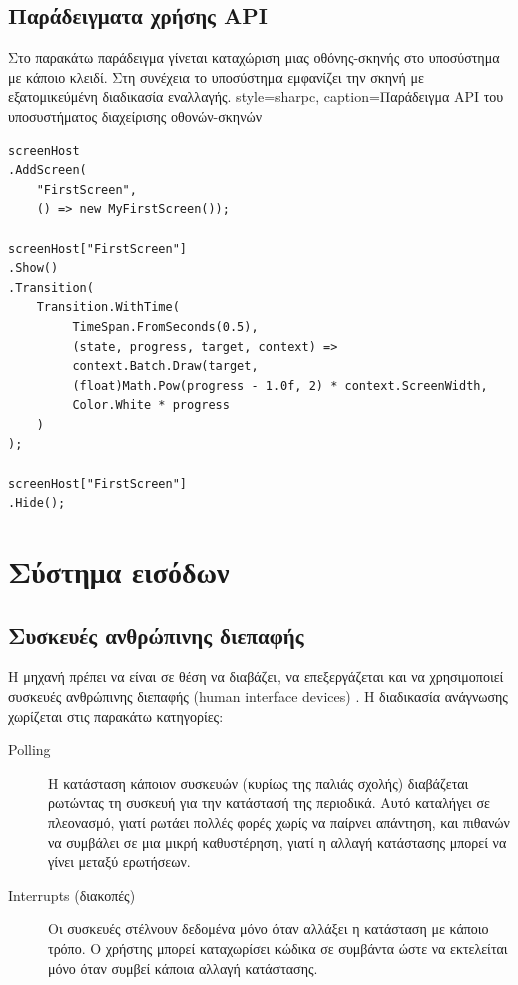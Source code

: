 	\subsection{Παράδειγματα χρήσης API}

Στο παρακάτω παράδειγμα γίνεται καταχώριση μιας οθόνης-σκηνής στο υποσύστημα με κάποιο κλειδί. Στη συνέχεια το υποσύστημα εμφανίζει την σκηνή με εξατομικεύμένη διαδικασία εναλλαγής.
	\lstset
	{
		style=sharpc, 
		caption={Παράδειγμα API του υποσυστήματος διαχείρισης οθονών-σκηνών}
	}
	\begin{lstlisting}
screenHost
.AddScreen(
	"FirstScreen",
	() => new MyFirstScreen());
		
screenHost["FirstScreen"]
.Show()
.Transition(
	Transition.WithTime(
         TimeSpan.FromSeconds(0.5),
         (state, progress, target, context) =>
         context.Batch.Draw(target, 
         (float)Math.Pow(progress - 1.0f, 2) * context.ScreenWidth, 
         Color.White * progress
    )
);
     
screenHost["FirstScreen"]
.Hide();   
	\end{lstlisting}
	
	\section{Σύστημα εισόδων}
	\subsection{Συσκευές ανθρώπινης διεπαφής}
	Η μηχανή πρέπει να είναι σε θέση να διαβάζει, να επεξεργάζεται και να χρησιμοποιεί συσκευές ανθρώπινης διεπαφής (human interface devices) \cite{gregory2009game}. Η διαδικασία ανάγνωσης χωρίζεται στις παρακάτω κατηγορίες:
	\begin{description}
	\item [Polling] Η κατάσταση κάποιον συσκευών (κυρίως της παλιάς σχολής) διαβάζεται ρωτώντας τη συσκευή για την κατάστασή της περιοδικά. Αυτό καταλήγει σε πλεονασμό, γιατί ρωτάει πολλές φορές χωρίς να παίρνει απάντηση, και πιθανών να συμβάλει σε μια μικρή καθυστέρηση, γιατί η αλλαγή κατάστασης μπορεί να γίνει μεταξύ ερωτήσεων.
	\item [Ιnterrupts (διακοπές)] Οι συσκευές στέλνουν δεδομένα μόνο όταν αλλάξει η κατάσταση με κάποιο τρόπο. Ο χρήστης μπορεί καταχωρίσει κώδικα σε συμβάντα ώστε να εκτελείται μόνο όταν συμβεί κάποια αλλαγή κατάστασης.
	\end{description}
	
